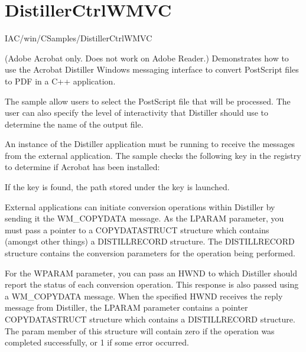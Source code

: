 \documentclass[letterpaper,12pt,english,openany,oneside]{sphinxmanual}
\begin{document}
\section{DistillerCtrlWMVC}
\label{\detokenize{Samples_WindowsIAC:distillerctrlwmvc}}\label{\detokenize{Samples_WindowsIAC:location-13}}

IAC/win/CSamples/DistillerCtrlWMVC

\label{\detokenize{Samples_WindowsIAC:description-13}}

(Adobe Acrobat only. Does not work on Adobe Reader.) Demonstrates how to use the Acrobat Distiller Windows messaging interface to convert PostScript files to PDF in a C++ application.

\label{\detokenize{Samples_WindowsIAC:usage-9}}

The sample allow users to select the PostScript file that will be processed. The user can also specify the level of interactivity that Distiller should use to determine the name of the output file.

\label{\detokenize{Samples_WindowsIAC:implementation-details-3}}

An instance of the Distiller application must be running to receive the messages from the external application. The sample checks the following key in the registry to determine if Acrobat has been installed:


If the key is found, the path stored under the key is launched.

External applications can initiate conversion operations within Distiller by sending it the WM\_COPYDATA message. As the LPARAM parameter, you must pass a pointer to a COPYDATASTRUCT structure which contains (amongst other things) a DISTILLRECORD structure. The DISTILLRECORD structure contains the conversion parameters for the operation being performed.

For the WPARAM parameter, you can pass an HWND to which Distiller should report the status of each conversion operation. This response is also passed using a WM\_COPYDATA message. When the specified HWND receives the reply message from Distiller, the LPARAM parameter contains a pointer COPYDATASTRUCT structure which contains a DISTILLRECORD structure. The param member of this structure will contain zero if the operation was completed successfully, or \sphinxhyphen{}1 if some error occurred.
\end{document}
